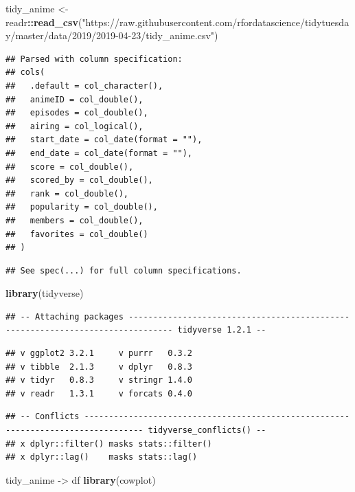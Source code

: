\documentclass[]{article}
\newenvironment{Shaded}{\begin{snugshade}}{\end{snugshade}}
\newcommand{\KeywordTok}[1]{\textcolor[rgb]{0.13,0.29,0.53}{\textbf{#1}}}
\newcommand{\NormalTok}[1]{#1}
\newcommand{\OperatorTok}[1]{\textcolor[rgb]{0.81,0.36,0.00}{\textbf{#1}}}
\newcommand{\StringTok}[1]{\textcolor[rgb]{0.31,0.60,0.02}{#1}}
\begin{document}
\begin{Shaded}
\begin{Highlighting}[]
\NormalTok{tidy_anime <-}\StringTok{ }\NormalTok{readr}\OperatorTok{::}\KeywordTok{read_csv}\NormalTok{(}\StringTok{"https://raw.githubusercontent.com/rfordatascience/tidytuesday/master/data/2019/2019-04-23/tidy_anime.csv"}\NormalTok{)}
\end{Highlighting}
\end{Shaded}

\begin{verbatim}
## Parsed with column specification:
## cols(
##   .default = col_character(),
##   animeID = col_double(),
##   episodes = col_double(),
##   airing = col_logical(),
##   start_date = col_date(format = ""),
##   end_date = col_date(format = ""),
##   score = col_double(),
##   scored_by = col_double(),
##   rank = col_double(),
##   popularity = col_double(),
##   members = col_double(),
##   favorites = col_double()
## )
\end{verbatim}

\begin{verbatim}
## See spec(...) for full column specifications.
\end{verbatim}

\begin{Shaded}
\begin{Highlighting}[]
\KeywordTok{library}\NormalTok{(tidyverse)}
\end{Highlighting}
\end{Shaded}

\begin{verbatim}
## -- Attaching packages ------------------------------------------------------------------------------- tidyverse 1.2.1 --
\end{verbatim}

\begin{verbatim}
## v ggplot2 3.2.1     v purrr   0.3.2
## v tibble  2.1.3     v dplyr   0.8.3
## v tidyr   0.8.3     v stringr 1.4.0
## v readr   1.3.1     v forcats 0.4.0
\end{verbatim}

\begin{verbatim}
## -- Conflicts ---------------------------------------------------------------------------------- tidyverse_conflicts() --
## x dplyr::filter() masks stats::filter()
## x dplyr::lag()    masks stats::lag()
\end{verbatim}

\begin{Shaded}
\begin{Highlighting}[]
\NormalTok{tidy_anime ->}\StringTok{ }\NormalTok{df}
\KeywordTok{library}\NormalTok{(cowplot)}
\end{Highlighting}
\end{Shaded}
\end{document}

